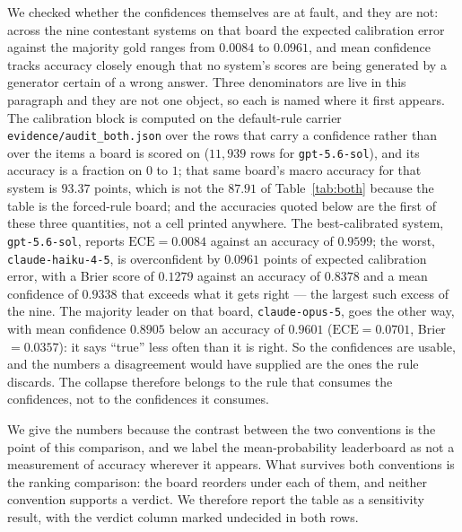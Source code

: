 \documentclass{article}
\newcommand{\ids}[1]{\texttt{\small #1}} %
\begin{document}
We checked whether the confidences themselves are at fault, and they are not: across the nine contestant systems on that board the expected calibration error against the majority gold ranges from $0.0084$ to $0.0961$, and mean confidence tracks accuracy closely enough that no system's scores are being generated by a generator certain of a wrong answer. Three denominators are live in this paragraph and they are not one object, so each is named where it first appears. The calibration block is computed on the default-rule carrier \ids{evidence/audit\_both.json} over the rows that carry a confidence rather than over the items a board is scored on ($11{,}939$ rows for \ids{gpt-5.6-sol}), and its accuracy is a fraction on $0$ to $1$; that same board's macro accuracy for that system is $93.37$ points, which is not the $87.91$ of Table~\ref{tab:both} because the table is the forced-rule board; and the accuracies quoted below are the first of these three quantities, not a cell printed anywhere. The best-calibrated system, \ids{gpt-5.6-sol}, reports $\mathrm{ECE} = 0.0084$ against an accuracy of $0.9599$; the worst, \ids{claude-haiku-4-5}, is overconfident by $0.0961$ points of expected calibration error, with a Brier score of $0.1279$ against an accuracy of $0.8378$ and a mean confidence of $0.9338$ that exceeds what it gets right --- the largest such excess of the nine. The majority leader on that board, \ids{claude-opus-5}, goes the other way, with mean confidence $0.8905$ below an accuracy of $0.9601$ ($\mathrm{ECE} = 0.0701$, Brier $= 0.0357$): it says ``true'' less often than it is right. So the confidences are usable, and the numbers a disagreement would have supplied are the ones the rule discards. The collapse therefore belongs to the rule that consumes the confidences, not to the confidences it consumes.

We give the numbers because the contrast between the two conventions is the point of this comparison, and we label the mean-probability leaderboard as not a measurement of accuracy wherever it appears. What survives both conventions is the ranking comparison: the board reorders under each of them, and neither convention supports a verdict. We therefore report the table as a sensitivity result, with the verdict column marked undecided in both rows.
\begin{table}[htbp] \centering \small

\caption{Macro accuracy under two gold definitions on the same 14,292 questions, each scored on the items that carry a label under the corresponding definition. This is the \emph{forced}-rule board: majority ties are resolved by answer string order and mean-probability ties by the mean of the two confidences. Under the rule that leaves a disagreement unmeasured the majority board is led by \ids{claude-opus-5} rather than \ids{gpt-5.6-sol}, and $4$ rather than $3$ of the nine systems change rank. $\Delta$ is computed before rounding; three of nine systems change rank here while the leader holds first place under both definitions; both definitions return an undecided verdict because the two annotations per item leave the floor and the leaderboard on different item sets. The mean-probability rows are not a measurement of judge accuracy, for the reason given in the text.}
\label{tab:both}
\end{table}
\end{document}
